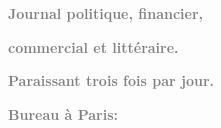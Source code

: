 \pstart
           \begin{otherlanguage}{french}\textcolor{gray}{\textbf{Journal politique, financier,}}\end{otherlanguage}\pend
           
\pstart
           \begin{otherlanguage}{french}\textcolor{gray}{\textbf{commercial et littéraire.}}\end{otherlanguage}\pend
           
\pstart
           \begin{otherlanguage}{french}\textcolor{gray}{\textbf{\textbf{Paraissant trois fois par jour.}}}\end{otherlanguage}\pend
           
\pstart
           \begin{otherlanguage}{french}\textcolor{gray}{\textbf{\textbf{Bureau à Paris:}}}\end{otherlanguage}\pend
           
